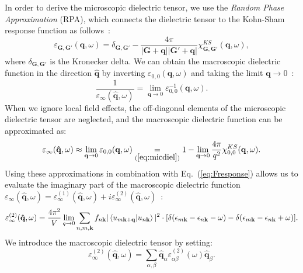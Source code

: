 \begin{refsection}
In order to derive the microscopic dielectric tensor, we use the \textit{Random Phase Approximation} (RPA), which connects the dielectric tensor to the Kohn-Sham response function as follows~\cite{Harl2008}:
\begin{equation}\label{eq:micdiel}
\varepsilon_{\mathbf{G},\mathbf{G}'}(\mathbf{q},\omega) = \delta_{\mathbf{G},\mathbf{G}'} - \frac{4 \pi}{|\mathbf{G} + \mathbf{q}| |\mathbf{G}' + \mathbf{q}|} \chi_{\mathbf{G},\mathbf{G}'}^{KS}(\mathbf{q},\omega),
\end{equation}
where $\delta_{\mathbf{G},\mathbf{G}'}$ is the Kronecker delta. We can obtain the macroscopic dielectric function in the direction $\mathbf{\hat{q}}$ by inverting $\varepsilon_{0,0}(\mathbf{q},\omega)$ and taking the limit $\mathbf{q}\rightarrow 0$~\cite{Gajdos2006}:
\begin{equation}
\frac{1}{\varepsilon_\infty(\mathbf{\hat{q}},\omega)} = \lim_{\mathbf{q}\rightarrow 0} \varepsilon_{0,0}^{-1}(\mathbf{q},\omega).
\end{equation}
When we ignore local field effects, the off-diagonal elements of the microscopic dielectric tensor are neglected, and the macroscopic dielectric function can be approximated as:
\begin{equation}
\varepsilon_\infty(\mathbf{\hat{q}},\omega) \approx \lim_{\mathbf{q}\rightarrow 0} \varepsilon_{0,0}(\mathbf{q},\omega) \underset{(\ref{eq:micdiel})}{=} 1 - \lim_{\mathbf{q}\rightarrow 0} \frac{4 \pi}{q^2} \chi_{0,0}^{KS}(\mathbf{q},\omega).
\end{equation}
Using these approximations in combination with Eq.~(\ref{eq:Fresponse}) allows us to evaluate the imaginary part of the macroscopic dielectric function $\varepsilon_\infty(\mathbf{\hat{q}},\omega) = \varepsilon_{\infty}^{(1)}(\mathbf{\hat{q}},\omega) + i\varepsilon_{\infty}^{(2)}(\mathbf{\hat{q}},\omega)$~\cite{Harl2008}:
 \begin{equation}\label{eq:imdiel}
\varepsilon_{\infty}^{(2)}(\mathbf{\hat{q}},\omega) = \frac{4\pi^2}{V} \lim_{q \rightarrow 0} \sum_{n,m,\mathbf{k}} f_{n\mathbf{k}} | \braket{u_{m\mathbf{k}+\mathbf{q}}|u_{n\mathbf{k}}} |^2 \cdot [\delta(\epsilon_{m\mathbf{k}}-\epsilon_{n\mathbf{k}}-\omega) - \delta(\epsilon_{m\mathbf{k}}-\epsilon_{n\mathbf{k}}+\omega)].
\end{equation}
We introduce the macroscopic dielectric tensor by setting:
\begin{equation}
\varepsilon_{\infty}^{(2)}(\mathbf{\hat{q}},\omega) = \sum_{\alpha,\beta} \mathbf{\hat{q}}_\alpha \varepsilon_{\alpha \beta}^{(2)} (\omega) \mathbf{\hat{q}}_\beta.

\end{equation}
\end{refsection}
